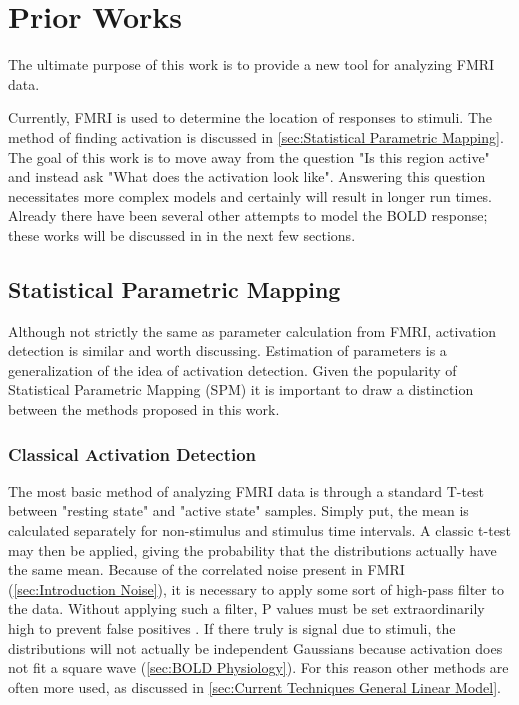 \chapter{Prior Works}
\label{sec:Prior Works}
The ultimate purpose of this work is to provide a new tool
for analyzing FMRI data. 

Currently, FMRI is used to determine the location of responses
to stimuli. The method of finding activation is discussed in 
\autoref{sec:Statistical Parametric Mapping}. The goal of this 
work is to move away from the question "Is this region active"
and instead ask "What does the activation look like". Answering
this question necessitates more complex models and certainly
will result in longer run times. Already there have been several other
attempts to model the BOLD response; these works will be discussed
in in the next few sections.

\section{Statistical Parametric Mapping}
\label{sec:Statistical Parametric Mapping}
Although not strictly the same as parameter calculation from 
FMRI, activation detection is similar and worth discussing. Estimation of 
parameters is a generalization of the idea of activation detection.
Given the popularity of Statistical Parametric Mapping (SPM) 
it is important to draw a distinction between the methods proposed
in this work.

\subsection{Classical Activation Detection}
\label{sec:Square Wave}
The most basic method of analyzing FMRI data is through a standard T-test
between "resting state" and "active state" samples. Simply put, the
mean is calculated separately for non-stimulus and stimulus time intervals.
A classic t-test may then be applied, giving the probability that the
distributions actually have the same mean. Because of the correlated
noise present in FMRI (\autoref{sec:Introduction Noise}), it is necessary
to apply some sort of high-pass filter to the data. Without applying
such a filter, P values must be set extraordinarily high to prevent
false positives \cite{Smith2007}. If there truly is signal
due to stimuli, the distributions will not actually be independent
Gaussians because activation does not fit a square wave 
(\autoref{sec:BOLD Physiology}). For this reason other methods
are often more used, as discussed in 
\autoref{sec:Current Techniques General Linear Model}.

